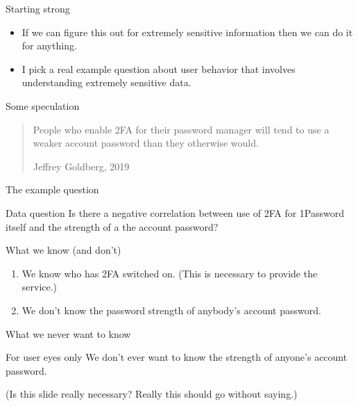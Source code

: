 \documentclass[xcolor={dvipsnames,table,hyperref}]{beamer}
\begin{document}
\begin{frame}{Starting strong}
  \begin{itemize}
    \item If we can figure this out for extremely sensitive information then we can do it for anything.
    \item I pick a real example question about user behavior that involves understanding extremely sensitive data.
  \end{itemize}
\end{frame}

\begin{frame}{Some speculation}
  \blockquote[{Jeffrey Goldberg, 2019}]{People who enable 2FA for their password manager will tend to use a weaker account password than they otherwise would.}
\end{frame}

\begin{frame}{The example question}
  \begin{block}{Data question}
    Is there a negative correlation between use of 2FA for 1Password itself and the strength of a the account password?
  \end{block}

\end{frame}

\begin{frame}{What we know (and don't)}
  \begin{enumerate}
    \item We know who has 2FA switched on. (This is necessary to provide the service.)
    \item We don't know the password strength of anybody's account password.
  \end{enumerate}

\end{frame}

\begin{frame}{What we never want to know}
  \begin{alertblock}{For user eyes only}
    We don't ever want to know the strength of anyone's account password.
  \end{alertblock}
  (Is this slide really necessary? Really this should go without saying.)
\end{frame}
\end{document}
